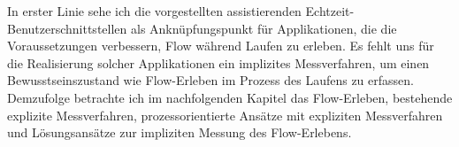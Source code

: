 In erster Linie sehe ich die vorgestellten assistierenden Echtzeit-Benutzerschnittstellen als Anknüpfungspunkt für Applikationen, die die Voraussetzungen verbessern, Flow während Laufen zu erleben. Es fehlt uns für die Realisierung solcher Applikationen ein implizites Messverfahren, um einen Bewusstseinszustand wie Flow-Erleben im Prozess des Laufens zu erfassen. Demzufolge betrachte ich im nachfolgenden Kapitel das Flow-Erleben, bestehende explizite Messverfahren, prozessorientierte Ansätze mit expliziten Messverfahren und Lösungsansätze zur impliziten Messung des Flow-Erlebens.

